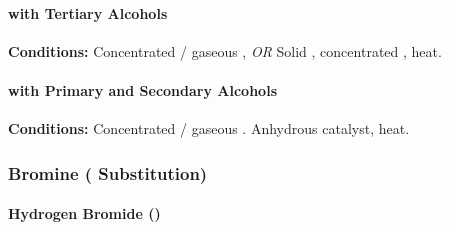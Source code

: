 				\paragraph{ with Tertiary Alcohols}

				\vspace{1.5em}
				\vbox{\textbf{Conditions:}	\tabto{35mm}Concentrated  / gaseous , \textit{OR}
											\tabto{35mm}Solid , concentrated , heat.}





				\pagebreak
				\paragraph{ with Primary and Secondary Alcohols}

				\vspace{1.5em}
				\vbox{\textbf{Conditions:}	\tabto{35mm}Concentrated  / gaseous .
											\tabto{35mm}Anhydrous  catalyst, heat.}






			\subsubsection{Bromine ( Substitution)}


				\paragraph{Hydrogen Bromide ()}


